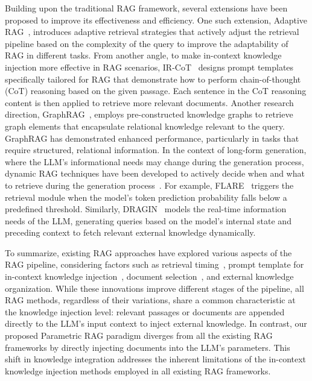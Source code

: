 \documentclass[sigconf,natbib=true,anonymous=false]{acmart}
\begin{document}
Building upon the traditional RAG framework, several extensions have been proposed to improve its effectiveness and efficiency. 
One such extension, Adaptive RAG~\cite{jeong2024adaptive,wang2023self}, introduces adaptive retrieval strategies that actively adjust the retrieval pipeline based on the complexity of the query to improve the adaptability of RAG in different tasks. 
From another angle, to make in-context knowledge injection more effective in RAG scenarios, IR-CoT~\cite{trivedi2022interleaving} designs prompt templates specifically tailored for RAG that demonstrate how to perform chain-of-thought (CoT) reasoning based on the given passage. 
Each sentence in the CoT reasoning content is then applied to retrieve more relevant documents.
Another research direction, GraphRAG~\cite{edge2024local,hu2024grag,peng2024graph}, employs pre-constructed knowledge graphs to retrieve graph elements that encapsulate relational knowledge relevant to the query. 
GraphRAG has demonstrated enhanced performance, particularly in tasks that require structured, relational information.
In the context of long-form generation, where the LLM’s informational needs may change during the generation process, dynamic RAG techniques have been developed to actively decide when and what to retrieve during the generation process~\cite{su2024dragin,jiang2023active,su2024mitigating,liu2024ctrla,yao2024seakr,baek2024probing}. 
For example, FLARE~\cite{jiang2023active} triggers the retrieval module when the model’s token prediction probability falls below a predefined threshold. 
Similarly, DRAGIN~\cite{su2024dragin} models the real-time information needs of the LLM, generating queries based on the model’s internal state and preceding context to fetch relevant external knowledge dynamically.



To summarize, existing RAG approaches have explored various aspects of the RAG pipeline, considering factors such as retrieval timing~\cite{su2024dragin,jiang2023active,su2024mitigating,liu2024ctrla,yao2024seakr,baek2024probing}, prompt template for in-context knowledge injection~\cite{wang2024rat,trivedi2022interleaving}, document selection~\cite{yu2024rankrag}, and external knowledge organization\cite{edge2024local,hu2024grag,peng2024graph}. 
While these innovations improve different stages of the pipeline, all RAG methods, regardless of their variations, share a common characteristic at the knowledge injection level: relevant passages or documents are appended directly to the LLM’s input context to inject external knowledge.
In contrast, our proposed Parametric RAG paradigm diverges from all the existing RAG frameworks by directly injecting documents into the LLM’s parameters. 
This shift in knowledge integration addresses the inherent limitations of the in-context knowledge injection methods employed in all existing RAG frameworks.
\end{document}
